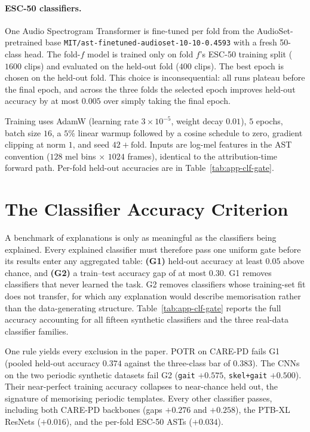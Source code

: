 \paragraph{ESC-50 classifiers.}
One Audio Spectrogram Transformer \citep{gong2021ast} is fine-tuned per
fold from the AudioSet-pretrained base
\texttt{MIT/ast-finetuned-audioset-10-10-0.4593} with a fresh 50-class head. The fold-$f$ model is trained only on fold $f$'s ESC-50 training split ($1600$ clips) and evaluated on the held-out fold ($400$ clips). The best epoch is chosen on the held-out fold. This choice is inconsequential: all runs plateau before the final epoch, and across the
three folds the selected epoch improves held-out accuracy by at most $0.005$ over simply taking the final epoch.

Training uses AdamW (learning rate
$3{\times}10^{-5}$, weight decay $0.01$), $5$ epochs, batch size $16$, a
$5\%$ linear warmup followed by a cosine schedule to zero, gradient clipping
at norm $1$, and seed $42{+}\mathrm{fold}$.  Inputs are log-mel features in
the AST convention ($128$ mel bins $\times$ $1024$ frames), identical to the
attribution-time forward path.  Per-fold held-out accuracies are in
Table~\ref{tab:app-clf-gate}.

\section{The Classifier Accuracy Criterion}
\label{app:clf_gate}

A benchmark of explanations is only as meaningful as the classifiers being
explained.  Every explained classifier must therefore pass one uniform gate
before its results enter any aggregated table: \textbf{(G1)} held-out
accuracy at least $0.05$ above chance, and \textbf{(G2)} a train--test
accuracy gap of at most $0.30$.  G1 removes classifiers that never learned
the task.  G2 removes classifiers whose training-set fit does not transfer,
for which any explanation would describe memorisation rather than the
data-generating structure.  Table~\ref{tab:app-clf-gate} reports the full
accuracy accounting for all fifteen synthetic classifiers and the three
real-data classifier families.



One rule yields every exclusion in the paper.  POTR on CARE-PD fails G1
(pooled held-out accuracy $0.374$ against the three-class bar of $0.383$).
The CNNs on the two periodic synthetic datasets fail G2 (\texttt{gait}
$+0.575$, \texttt{skel+gait} $+0.500$).  Their near-perfect training
accuracy collapses to near-chance held out, the signature of memorising
periodic templates.  Every other classifier passes, including both CARE-PD
backbones (gaps $+0.276$ and $+0.258$), the PTB-XL ResNets ($+0.016$), and
the per-fold ESC-50 ASTs ($+0.034$).

